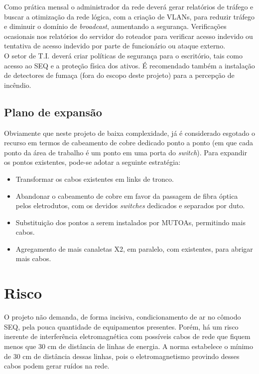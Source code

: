 \documentclass[	DIV=calc,%
							paper=a4,%
							fontsize=12pt,%
							onecolumn]{scrartcl}	 					%
\begin{document}
Como prática mensal o administrador da rede deverá gerar relatórios de tráfego e buscar a otimização da rede lógica, com a criação de VLANs, para reduzir tráfego e diminuir o domínio de \textit{broadcast}, aumentando a segurança. Verificações ocasionais nos relatórios do servidor do roteador para verificar acesso indevido ou tentativa de acesso indevido por parte de funcionário ou ataque externo.
\\

O setor de T.I. deverá criar políticas de segurança para o escritório, tais como acesso ao SEQ e a proteção física dos ativos. É recomendado também a instalação de detectores de fumaça (fora do escopo deste projeto) para a percepção de incêndio.

\subsection{Plano de expansão}

Obviamente que neste projeto de baixa complexidade, já é considerado esgotado o recurso em termos de cabeamento de cobre dedicado ponto a ponto (em que cada ponto da área de trabalho é um ponto em uma porta do \textit{switch}). Para expandir os pontos existentes, pode-se adotar a seguinte estratégia:
\\

\begin{itemize}
	\item Transformar os cabos existentes em links de tronco.
	\\
	\item Abandonar o cabeamento de cobre em favor da passagem de fibra óptica pelos eletrodutos, com os devidos \textit{switches} dedicados e separados por duto.
	\\
	\item Substituição dos pontos a serem instalados por MUTOAs, permitindo mais cabos.
	\\
	\item Agregamento de mais canaletas X2, em paralelo, com existentes, para abrigar mais cabos.
\end{itemize}


\section{Risco}

O projeto não demanda, de forma incisiva, condicionamento de ar no cômodo SEQ, pela pouca quantidade de equipamentos presentes. Porém, há um risco inerente de interferência eletromagnética com possíveis cabos de rede que fiquem menos que 30 cm de distância de linhas de energia. A norma estabelece o mínimo de 30 cm de distância dessas linhas, pois o eletromagnetismo provindo desses cabos podem gerar ruídos na rede.
\\
\end{document}
